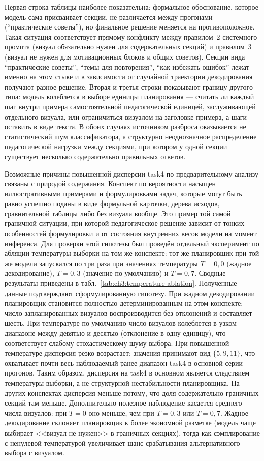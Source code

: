 Первая строка таблицы наиболее показательна: формальное обоснование, которое модель сама присваивает секции, не различается между прогонами (``практические советы''), но финальное решение меняется на противоположное. Такая ситуация соответствует прямому конфликту между правилом~2 системного промпта (визуал обязательно нужен для содержательных секций) и правилом~3 (визуал не нужен для мотивационных блоков и общих советов). Секции вида ``практические советы'', ``темы для повторения'', ``как избежать ошибок'' лежат именно на этом стыке и в зависимости от случайной траектории декодирования получают разное решение. Вторая и третья строки показывают границу другого типа: модель колеблется в выборе единицы планирования --- считать ли каждый шаг внутри примера самостоятельной педагогической единицей, заслуживающей отдельного визуала, или ограничиться визуалом на заголовке примера, а шаги оставить в виде текста. В обоих случаях источником разброса оказывается не статистический шум классификатора, а структурно неоднозначное распределение педагогической нагрузки между секциями, при котором у одной секции существует несколько содержательно правильных ответов.

Возможные причины повышенной дисперсии task4 по предварительному анализу связаны с природой содержания. Конспект по вероятности насыщен иллюстративными примерами и формулировками задач, которые могут быть равно успешно поданы в виде формульной карточки, дерева исходов, сравнительной таблицы либо без визуала вообще. Это пример той самой граничной ситуации, при которой педагогическое решение зависит от тонких особенностей формулировки и от состояния внутренних весов модели на момент инференса. Для проверки этой гипотезы был проведён отдельный эксперимент по абляции температуры выборки на том же конспекте: тот же планировщик при той же модели запускался по три раза при значениях температуры \(T = 0{,}0\) (жадное декодирование), \(T = 0{,}3\) (значение по умолчанию) и \(T = 0{,}7\). Сводные результаты приведены в табл.~\ref{tab:ch3:temperature-ablation}. Полученные данные подтверждают сформулированную гипотезу. При жадном декодировании планировщик становится полностью детерминированным на этом конспекте: число запланированных визуалов воспроизводится без отклонений и составляет шесть. При температуре по умолчанию число визуалов колеблется в узком диапазоне между девятью и десятью (отклонение в одну единицу), что соответствует слабому стохастическому шуму выбора. При повышенной температуре дисперсия резко возрастает: значения принимают вид \(\{5, 9, 11\}\), что охватывает почти весь наблюдаемый ранее диапазон task4 в основной серии прогонов. Таким образом, дисперсия на task4 в основном является следствием температуры выборки, а не структурной нестабильности планировщика. На других конспектах дисперсия меньше потому, что доля содержательно граничных секций там меньше. Дополнительно полезное наблюдение касается среднего числа визуалов: при \(T = 0\) оно меньше, чем при \(T = 0{,}3\) или \(T = 0{,}7\). Жадное декодирование склоняет планировщик к более экономной разметке (модель чаще выбирает <<визуал не нужен>> в граничных секциях), тогда как сэмплирование с ненулевой температурой увеличивает шанс срабатывания альтернативного выбора с визуалом.

